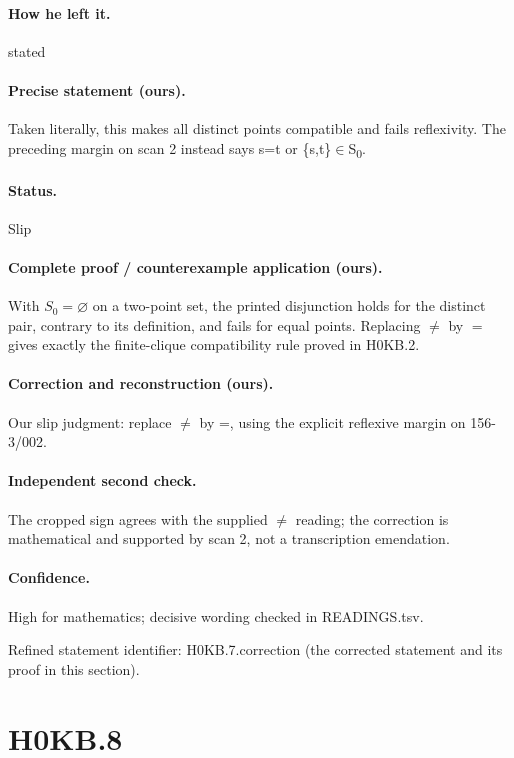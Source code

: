 \paragraph{How he left it.} stated

\paragraph{Precise statement (ours).} Taken literally, this makes all distinct points compatible and fails reflexivity. The preceding margin on scan 2 instead says s=t or \{s,t\}\ensuremath{\in}S\textsubscript{0}.

\paragraph{Status.} Slip

\paragraph{Complete proof / counterexample application (ours).} With \(S_0=\varnothing\) on a two-point set, the printed disjunction holds for the distinct pair, contrary to its definition, and fails for equal points. Replacing \(\ne\) by \(=\) gives exactly the finite-clique compatibility rule proved in H0KB.2.

\paragraph{Correction and reconstruction (ours).} Our slip judgment: replace \ensuremath{\ne} by =, using the explicit reflexive margin on 156-3/002.

\paragraph{Independent second check.} The cropped sign agrees with the supplied \ensuremath{\ne} reading; the correction is mathematical and supported by scan 2, not a transcription emendation.

\paragraph{Confidence.} High for mathematics; decisive wording checked in READINGS.tsv.

\noindent Refined statement identifier: H0KB.7.correction (the corrected statement and its proof in this section).

\section*{H0KB.8}\label{statement:H0KB.8}
